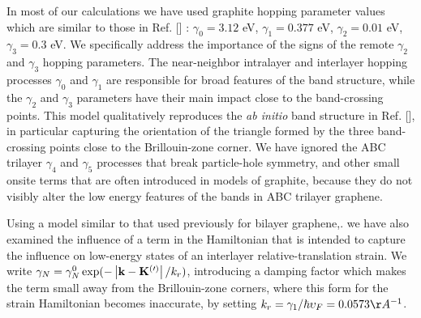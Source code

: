 \documentclass[twocolumn,prb,showpacs,preprintnumbers,amsmath,amssymb]{revtex4}
\begin{document}
In most of our calculations we have used 
graphite hopping parameter values which are similar to those in Ref. [] :
$\gamma_0 = 3.12$ eV, $\gamma_1 = 0.377$ eV,  $\gamma_2 = 0.01$ eV,  $\gamma_3 = 0.3$ eV.
We specifically address the importance of the signs of the remote $\gamma_2$ and 
$\gamma_3$ hopping parameters.  
The near-neighbor intralayer and interlayer hopping processes $\gamma_0$ and $\gamma_1$ 
are responsible for broad features of the band structure, while the 
$\gamma_2$ and $\gamma_3$ parameters have their 
main impact close to the band-crossing points.  
This model qualitatively reproduces the {\em ab initio} band structure in Ref. [],
in particular capturing the orientation of the triangle formed by the three 
band-crossing points close to the Brillouin-zone corner.
We have ignored the ABC trilayer 
 $\gamma_4$ and $\gamma_5$ processes that break particle-hole symmetry, 
and other small onsite terms that are often introduced in models of graphite, because 
they do not visibly alter the low energy features of the bands in ABC trilayer graphene.

Using a model similar to that used previously for bilayer graphene,\cite{youngwoo,kruczynski}. 
we have also examined the influence of a term in the Hamiltonian that is intended to capture the 
influence on low-energy states of an interlayer relative-translation strain.  
We write 
$\gamma_N = \gamma_N^{0} \exp(- \left| {\bf k} - {\bf K}^{(\prime)} \right| / k_r)$, 
introducing a damping factor which makes the term small
away from the Brillouin-zone corners, where this form
for the strain Hamiltonian becomes inaccurate, by setting  
$k_r = \gamma_1 / \hbar \upsilon_F = 0.0573 \AA^{-1}$.
\end{document}

